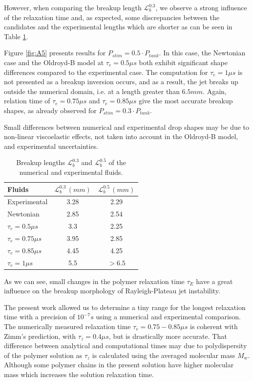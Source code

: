 \documentclass[onecolumn, 12pt]{asme2ej}
\begin{document}
However, when comparing the breakup length $\mathcal{L}^{0.3}_b$, we observe a strong influence of the relaxation time and, as expected, some discrepancies between the candidates and the experimental lengths which are shorter as can be seen in Table \ref{tab:lbInkExNum}. 


Figure \ref{fig:A5} presents results for $P_{stim}=0.5\cdot P_{tank}$. In this case, the Newtonian case and the Oldroyd-B model at  $\tau_e = 0.5 \mu s$ both exhibit significant shape differences compared to the experimental case. The computation for  $\tau_e = 1 \mu s$ is not presented as a breakup inversion occurs, and as a result, the jet breaks up outside the numerical domain, i.e. at a length greater than $6.5mm$.
Again, relation time of  $\tau_e = 0.75 \mu s$ and  $\tau_e = 0.85 \mu s$ give the most accurate breakup shapes, as already observed for $P_{stim}=0.3\cdot P_{tank}$.


Small differences between numerical and experimental drop shapes may be due to non-linear viscoelastic effects, not taken into account in the Oldroyd-B model, and experimental uncertainties.

\begin{table}[H]
    \begin{center}
        \begin{tabular}{l|cc}
            Fluids & $\mathcal{L}^{0.3}_b\,(mm)$ &$\mathcal{L}^{0.5}_b\,(mm)$\\
            \hline
            Experimental  & 3.28  &2.29 \\
            Newtonian & 2.85 & 2.54\\ 
            $\tau_e = 0.5\mu s$ & 3.3 & 2.25\\ 
            $\tau_e = 0.75\mu s$ & 3.95 & 2.85\\ 
            $\tau_e = 0.85\mu s$ & 4.45 & 4.25\\ 
            $\tau_e = 1\mu s$ & 5.5 & $> 6.5$\\ 
            \hline
        \end{tabular}
    \end{center}
    \caption{Breakup lengths $\mathcal{L}^{0.3}_b$ and $\mathcal{L}^{0.5}_b$ of the numerical and experimental fluids.}
    \label{tab:lbInkExNum}
\end{table}


As we can see, small changes in the polymer relaxation time $\tau_E$ have a great influence on the breakup morphology of Rayleigh-Plateau jet instability. 

The present work allowed us to determine a tiny range for the longest relaxation time with a precision of $10^{-7} s$ using a numerical and experimental comparison. The numerically measured relaxation time $\tau_e = 0.75-0.85 \mu s$ is coherent with Zimm's prediction, with $\tau_z = 0.4 \mu s$, but is drastically more accurate. That difference between analytical and computational times may due to polydispersity of the polymer solution as $\tau_z$ is calculated using the averaged molecular mass $M_w$. Although some polymer chains in the present solution have higher molecular mass which increases the solution relaxation time.
\end{document}

